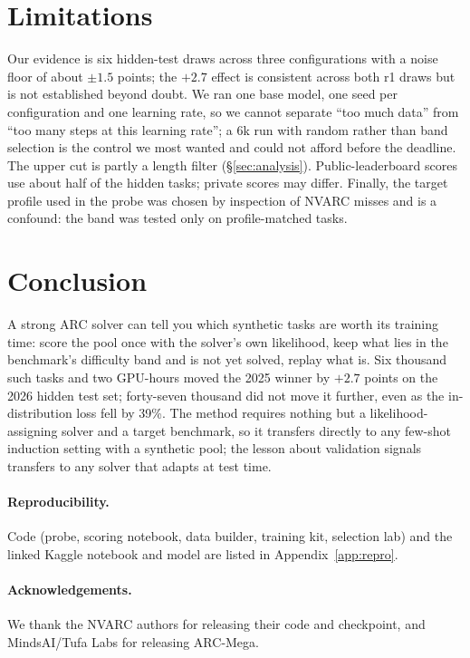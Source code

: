 \documentclass[11pt]{article}
\newcommand{\nvarc}{NVARC}
\newcommand{\mega}{ARC-Mega}
\begin{document}
\section{Limitations}
Our evidence is six hidden-test draws across three configurations with a noise floor of about $\pm1.5$ points; the $+2.7$ effect is consistent across both r1 draws but is not established beyond doubt. We ran one base model, one seed per configuration and one learning rate, so we cannot separate ``too much data'' from ``too many steps at this learning rate''; a 6k run with random rather than band selection is the control we most wanted and could not afford before the deadline. The upper cut is partly a length filter (\S\ref{sec:analysis}). Public-leaderboard scores use about half of the hidden tasks; private scores may differ. Finally, the target profile used in the probe was chosen by inspection of \nvarc{} misses and is a confound: the band was tested only on profile-matched tasks.

\section{Conclusion}
A strong ARC solver can tell you which synthetic tasks are worth its training time: score the pool once with the solver's own likelihood, keep what lies in the benchmark's difficulty band and is not yet solved, replay what is. Six thousand such tasks and two GPU-hours moved the 2025 winner by $+2.7$ points on the 2026 hidden test set; forty-seven thousand did not move it further, even as the in-distribution loss fell by 39\%. The method requires nothing but a likelihood-assigning solver and a target benchmark, so it transfers directly to any few-shot induction setting with a synthetic pool; the lesson about validation signals transfers to any solver that adapts at test time.

\paragraph{Reproducibility.}
Code (probe, scoring notebook, data builder, training kit, selection lab) and the linked Kaggle notebook and model are listed in Appendix~\ref{app:repro}.

\paragraph{Acknowledgements.}
We thank the \nvarc{} authors for releasing their code and checkpoint, and MindsAI/Tufa Labs for releasing \mega{}.
\end{document}
